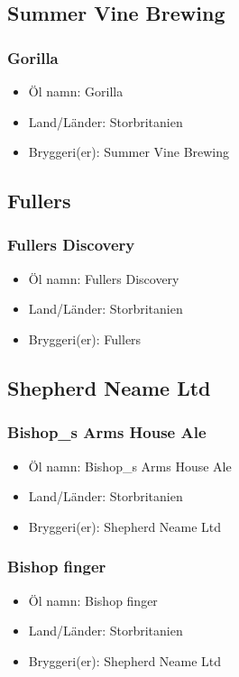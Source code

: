 \documentclass[11pt]{article}
\begin{document}
\subsection{Summer Vine Brewing}
\label{sec:orgf5b92f0}
\subsubsection{Gorilla}
\label{sec:org6543d92}
\begin{itemize}
\item Öl namn: Gorilla
\item Land/Länder: Storbritanien
\item Bryggeri(er): Summer Vine Brewing
\end{itemize}
\subsection{Fullers}
\label{sec:org0c4f8e2}
\subsubsection{Fullers Discovery}
\label{sec:orgc3e3062}
\begin{itemize}
\item Öl namn: Fullers Discovery
\item Land/Länder: Storbritanien
\item Bryggeri(er): Fullers
\end{itemize}
\subsection{Shepherd Neame Ltd}
\label{sec:org50ed62e}
\subsubsection{Bishop\_s Arms House Ale}
\label{sec:org66090f5}
\begin{itemize}
\item Öl namn: Bishop\_s Arms House Ale
\item Land/Länder: Storbritanien
\item Bryggeri(er): Shepherd Neame Ltd
\end{itemize}
\subsubsection{Bishop finger}
\label{sec:org36a1dfc}
\begin{itemize}
\item Öl namn: Bishop finger
\item Land/Länder: Storbritanien
\item Bryggeri(er): Shepherd Neame Ltd
\end{itemize}
\end{document}
